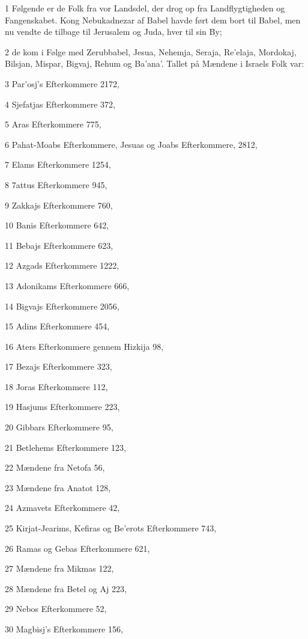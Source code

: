 \par 1 Følgende er de Folk fra vor Landsdel, der drog op fra Landflygtigheden og Fangenskabet. Kong Nebukadnezar af Babel havde ført dem bort til Babel, men nu vendte de tilbage til Jerusalem og Juda, hver til sin By;
\par 2 de kom i Følge med Zerubbabel, Jesua, Nehemja, Seraja, Re'elaja, Mordokaj, Bilsjan, Mispar, Bigvaj, Rehum og Ba'ana'. Tallet på Mændene i Israels Folk var:
\par 3 Par'osj's Efterkommere 2172,
\par 4 Sjefatjas Efterkommere 372,
\par 5 Aras Efterkommere 775,
\par 6 Pahat-Moabs Efterkommere, Jesuas og Joabs Efterkommere, 2812,
\par 7 Elams Efterkommere 1254,
\par 8 7attus Efterkommere 945,
\par 9 Zakkajs Efterkommere 760,
\par 10 Banis Efterkommere 642,
\par 11 Bebajs Efterkommere 623,
\par 12 Azgads Efterkommere 1222,
\par 13 Adonikams Efterkommere 666,
\par 14 Bigvajs Efterkommere 2056,
\par 15 Adins Efterkommere 454,
\par 16 Aters Efterkommere gennem Hizkija 98,
\par 17 Bezajs Efterkommere 323,
\par 18 Joras Efterkommere 112,
\par 19 Hasjums Efterkommere 223,
\par 20 Gibbars Efterkommere 95,
\par 21 Betlehems Efterkommere 123,
\par 22 Mændene fra Netofa 56,
\par 23 Mændene fra Anatot 128,
\par 24 Azmavets Efterkommere 42,
\par 25 Kirjat-Jearims, Kefiras og Be'erots Efterkommere 743,
\par 26 Ramas og Gebas Efterkommere 621,
\par 27 Mændene fra Mikmas 122,
\par 28 Mændene fra Betel og Aj 223,
\par 29 Nebos Efterkommere 52,
\par 30 Magbisj's Efterkommere 156,
